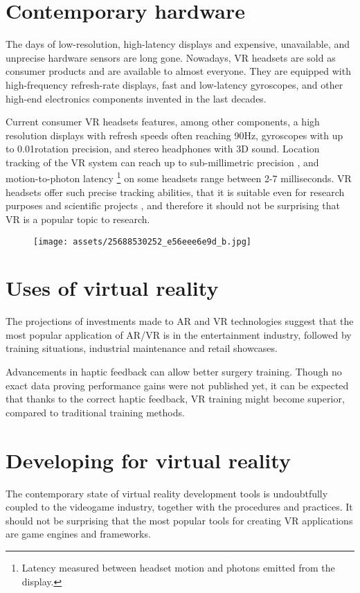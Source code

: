 \section{Contemporary hardware}
The days of low-resolution, high-latency displays and expensive, unavailable,
and unprecise hardware sensors are long gone. Nowadays, VR headsets are
sold as consumer products and are available to almost everyone. They are
equipped with high-frequency refresh-rate displays, fast and low-latency
gyroscopes, and other high-end electronics components invented in the last
decades.

Current consumer VR headsets features, among other components,
a high resolution displays with refresh speeds often reaching 90Hz, gyroscopes
with up to 0.01\degree rotation precision, and stereo headphones with 3D sound.
Location tracking of the VR system can reach up to sub-millimetric precision
\cite{vivenasa}, and motion-to-photon latency
\footnote{Latency measured between headset motion and photons emitted from the display.}
on some headsets range between 2-7 milliseconds. \cite{mtpltc} \cite{xinwiki}
VR headsets offer such precise tracking abilities, that it is suitable even
for research purposes and scientific projects \cite{vivepbsr}, and therefore
it should not be surprising that VR is a popular topic to research.


\begin{figure}[h]{}
\centering\texttt{[image: assets/25688530252\_e56eee6e9d\_b.jpg]}
\caption{}

\end{figure}

\section{Uses of virtual reality}
The projections of investments made to AR and VR technologies suggest
that the most popular application of AR/VR is in the entertainment industry,
followed by training situations, industrial maintenance and retail showcases.
\cite{statistavr}


Advancements in haptic feedback can allow better surgery training\cite{vhfcrmisvrt}. 
Though no exact data proving performance gains
were not published yet, it can be expected that thanks to the correct haptic
feedback, VR training might become superior, compared to traditional
training methods.\cite{vrsrgr}


\hypertarget{x-developing-for-virtual-reality}{\section{Developing for virtual reality}}
The contemporary state of virtual reality development tools is undoubtfully
coupled to the videogame industry, together with the procedures and practices.
It should not be surprising that the most popular tools for creating
VR applications are game engines and frameworks.


